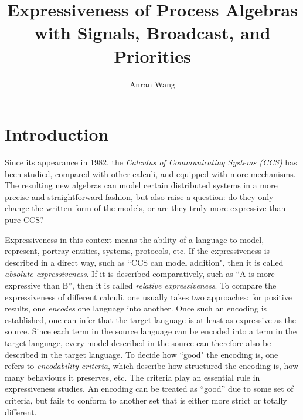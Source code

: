 \documentclass[adraft,hidelinks]{eptcs}
\begin{document}
\def\titlerunning{Expressiveness}
\def\authorrunning{Anran Wang}
\title{\Large Expressiveness of Process Algebras with Signals, Broadcast, and Priorities}
\author{Anran Wang}
\maketitle

\tableofcontents

%
\section{Introduction}

Since its appearance in 1982, the \emph{Calculus of Communicating Systems (CCS)} \cite{RM80} has been studied, compared with other calculi, and equipped with more mechanisms.
The resulting new algebras can model certain distributed systems in a more precise and straightforward fashion, but also raise a question: do they only change the written form of the models, or are they truly more expressive than pure CCS?

Expressiveness in this context means the ability of a language to model, represent, portray entities, systems, protocols, etc.
If the expressiveness is described in a direct way, such as ``CCS can model addition", then it is called \emph{absolute expressiveness}.
If it is described comparatively, such as ``A is more expressive than B'', then it is called \emph{relative expressiveness}.
To compare the expressiveness of different calculi, one usually takes two approaches: for positive results, one \emph{encodes} one language into another.
Once such an encoding is established, one can infer that the target language is at least as expressive as the source.
Since each term in the source language can be encoded into a term in the target language, every model described in the source can therefore also be described in the target language.
To decide how ``good" the encoding is, one refers to \emph{encodability criteria}, which describe how structured the encoding is, how many behaviours it preserves, etc.
The criteria play an essential rule in expressiveness studies.
An encoding can be treated as ``good'' due to some set of criteria, but fails to conform to another set that is either more strict or totally different.
\end{document}
